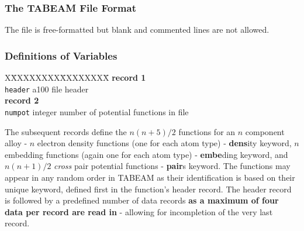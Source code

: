 \subsubsection{The TABEAM File Format}

The file is free-formatted but blank and commented lines are not
allowed.

\subsubsection{Definitions of Variables}

\begin{tabbing}
X\=XXXXXXXX\=XXXXXXXX\=\kill
{\bf record 1} \\
\> {\tt header} \> a100    \> file header\\
{\bf record 2} \\
\> {\tt numpot} \> integer \> number of potential functions in file \\
\end{tabbing}
The subsequent records define the $n(n+5)/2$ functions for an $n$
component alloy - $n$ electron density functions (one for each atom type)
- {\bf dens}ity keyword, $n$ embedding functions (again one for each atom
type) - {\bf embe}ding keyword, and $n(n+1)/2$ {\it cross} pair potential
functions - {\bf pair}s keyword.  The functions may appear in any random
order in TABEAM as their identification is based on their unique keyword,
defined first in the function's header record.  The header record is
followed by a predefined number of data records {\bf as a maximum of four data
per record are read in} - allowing for incompletion of the very last record.

